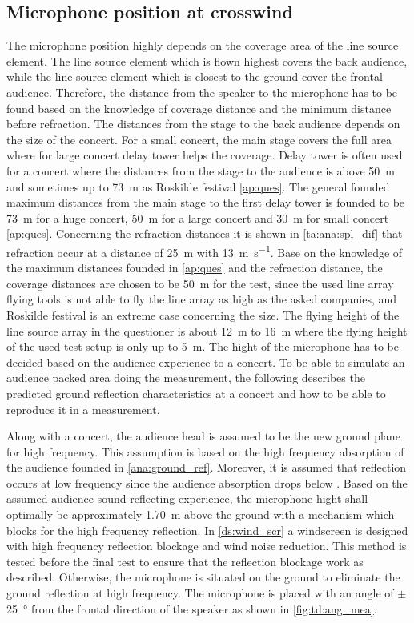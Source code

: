 \subsection{Microphone position at crosswind}
The microphone position highly depends on the coverage area of the line source element. The line source element which is flown highest covers the back audience, while the line source element which is closest to the ground cover the frontal audience. Therefore, the distance from the speaker to the microphone has to be found based on the knowledge of coverage distance and the minimum distance before refraction. The distances from the stage to the back audience depends on the size of the concert. For a small concert, the main stage covers the full area where for large concert delay tower helps the coverage. Delay tower is often used for a concert where the distances from the stage to the audience is above \SI{50}{\meter} and sometimes up to \SI{73}{\meter} as Roskilde festival \autoref{ap:ques}. The general founded maximum distances from the main stage to the first delay tower is founded to be \SI{73}{\meter} for a huge concert, \SI{50}{\meter} for a large concert and \SI{30}{\meter} for small concert \autoref{ap:ques}. 
Concerning the refraction distances it is shown in \autoref{ta:ana:spl_dif} that refraction occur at a distance of \SI{25}{\meter} with \SI{13}{\meter\per\second}.
Base on the knowledge of the maximum distances founded in \autoref{ap:ques} and the refraction distance, the coverage distances are chosen to be \SI{50}{\meter} for the test, since the used line array flying tools is not able to fly the line array as high as the asked companies, and Roskilde festival is an extreme case concerning the size. The flying height of the line source array in the questioner is about \SI{12}{\meter} to \SI{16}{\meter} where the flying height of the used test setup is only up to \SI{5}{\meter}.  
The hight of the microphone has to be decided based on the audience experience to a concert. To be able to simulate an audience packed area doing the measurement, the following describes the predicted ground reflection characteristics at a concert and how to be able to reproduce it in a measurement. 

Along with a concert, the audience head is assumed to be the new ground plane for high frequency. This assumption is based on the high frequency absorption of the audience founded in \autoref{ana:ground_ref}. Moreover, it is assumed that reflection occurs at low frequency since the audience absorption drops below . Based on the assumed audience sound reflecting experience, the microphone hight shall optimally be approximately \SI{1.70}{\meter} above the ground with a mechanism which blocks for the high frequency reflection. In \autoref{ds:wind_scr} a windscreen is designed with high frequency reflection blockage and wind noise reduction. This method is tested before the final test to ensure that the reflection blockage work as described. Otherwise, the microphone is situated on the ground to eliminate the ground reflection at high frequency. The microphone is placed with an angle of $\pm$ \SI{25}{\degree} from the frontal direction of the speaker as shown in \autoref{fig:td:ang_mea}.

